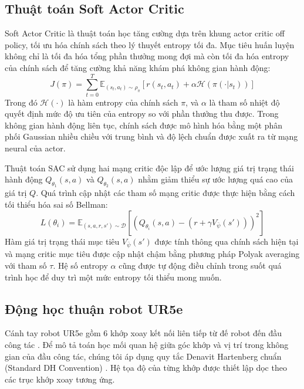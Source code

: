 \documentclass[conference]{IEEEtran}
\begin{document}
\subsection{Thuật toán Soft Actor Critic}
Soft Actor Critic \cite{haarnoja2018soft} là thuật toán học tăng cường dựa trên khung actor critic off policy, tối ưu hóa chính sách theo lý thuyết entropy tối đa. Mục tiêu huấn luyện không chỉ là tối đa hóa tổng phần thưởng mong đợi mà còn tối đa hóa entropy của chính sách để tăng cường khả năng khám phá không gian hành động:
\begin{equation}
J(\pi) = \sum_{t=0}^{T} \mathbb{E}_{(s_t,a_t)\sim\rho_\pi} \left[ r(s_t,a_t) + \alpha \mathcal{H}(\pi(\cdot|s_t)) \right]
\end{equation}
Trong đó $\mathcal{H}(\cdot)$ là hàm entropy của chính sách $\pi$, và $\alpha$ là tham số nhiệt độ quyết định mức độ ưu tiên của entropy so với phần thưởng thu được. Trong không gian hành động liên tục, chính sách được mô hình hóa bằng một phân phối Gaussian nhiều chiều với trung bình và độ lệch chuẩn được xuất ra từ mạng neural của actor.

Thuật toán SAC sử dụng hai mạng critic độc lập để ước lượng giá trị trạng thái hành động $Q_{\theta_1}(s, a)$ và $Q_{\theta_2}(s, a)$ nhằm giảm thiểu sự ước lượng quá cao của giá trị $Q$. Quá trình cập nhật các tham số mạng critic được thực hiện bằng cách tối thiểu hóa sai số Bellman:
\begin{equation}
L(\theta_i) = \mathbb{E}_{(s,a,r,s')\sim \mathcal{D}} \left[ \left( Q_{\theta_i}(s,a) - \left( r + \gamma V_{\bar{\psi}}(s') \right) \right)^2 \right]
\end{equation}
Hàm giá trị trạng thái mục tiêu $V_{\bar{\psi}}(s')$ được tính thông qua chính sách hiện tại và mạng critic mục tiêu được cập nhật chậm bằng phương pháp Polyak averaging với tham số $\tau$. Hệ số entropy $\alpha$ cũng được tự động điều chỉnh trong suốt quá trình học để duy trì một mức entropy tối thiểu mong muốn.

\subsection{Động học thuận robot UR5e}
Cánh tay robot UR5e gồm 6 khớp xoay kết nối liên tiếp từ đế robot đến đầu công tác \cite{ur5espec}. Để mô tả toán học mối quan hệ giữa góc khớp và vị trí trong không gian của đầu công tác, chúng tôi áp dụng quy tắc Denavit Hartenberg chuẩn (Standard DH Convention) \cite{hawkins2013analytic, andersen2018kinematics, craig2005introduction, spong2006robot}. Hệ tọa độ của từng khớp được thiết lập dọc theo các trục khớp xoay tương ứng.
\end{document}
